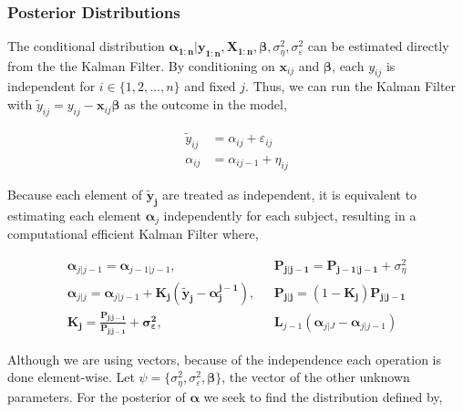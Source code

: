 \documentclass[
]{article}
\begin{document}
\hypertarget{posterior-distributions}{%
\subsubsection{Posterior Distributions}\label{posterior-distributions}}

The conditional distribution \(\boldsymbol{\alpha_{1:n}}|\boldsymbol{y_{1:n}}, \boldsymbol{X_{1:n}}, \boldsymbol{\beta}, \sigma^2_\eta, \sigma^2_\varepsilon\) can be estimated directly from the the Kalman Filter. By conditioning on \(\boldsymbol{x}_{ij}\) and \(\boldsymbol{\beta}\), each \({y_{ij}}\) is independent for \(i \in \{1, 2, ..., n\}\) and fixed \(j\). Thus, we can run the Kalman Filter with \(\tilde y_{ij} = y_{ij} - \boldsymbol{x}_{ij} \boldsymbol{\beta}\) as the outcome in the model,

\begin{equation*}
\begin{aligned}
\tilde y_{ij} &= \alpha_{ij}  +\varepsilon_{ij}\\
\alpha_{ij} &= \alpha_{i{j-1}} + \eta_{ij}
\end{aligned}
\end{equation*}

Because each element of \(\boldsymbol{\tilde y_{j}}\) are treated as independent, it is equivalent to estimating each element \(\boldsymbol{\alpha}_{j}\) independently for each subject, resulting in a computational efficient Kalman Filter where,

\begin{equation*}
\begin{aligned}
\boldsymbol{\alpha}_{j|j-1} = \boldsymbol{\alpha}_{j-1|j-1}, \ \ \ & \boldsymbol{P_{j|j-1} = P_{j-1|j-1}} + \sigma^2_\eta\\
\boldsymbol{\alpha}_{j|j} = \boldsymbol{\alpha}_{j|j-1} + \boldsymbol{K_j} (\boldsymbol{\tilde y_j- \alpha_j^{j-1}}), \ \ \ & \boldsymbol{P_{j|j}} = (1-\boldsymbol{K_j})\boldsymbol{P_{j|j-1}}\\
\boldsymbol{K_j} = \boldsymbol{\frac{\boldsymbol{P}_{j|j-1}}{\boldsymbol{P}_{j|j-1}} + \sigma^2_\varepsilon}, \ \ \ &\boldsymbol{L}_{j-1}(\boldsymbol{\alpha}_{j|J} - \boldsymbol{\alpha}_{j|j-1})
\end{aligned}
\end{equation*}

Although we are using vectors, because of the independence each operation is done element-wise. Let \(\psi = \{\sigma^2_\eta, \sigma^2_\varepsilon, \boldsymbol{\beta}\}\), the vector of the other unknown parameters. For the posterior of \(\boldsymbol{\alpha}\) we seek to find the distribution defined by,
\end{document}
